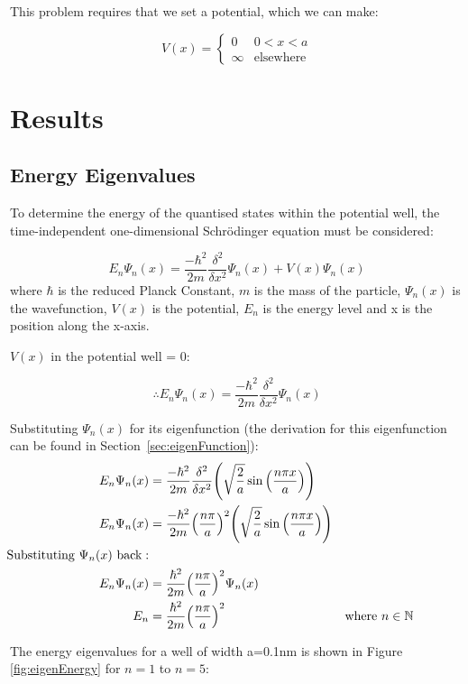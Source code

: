 This problem requires that we set a potential, which we can make:

\[
  V(x) = \begin{cases}
  0 & 0 < x < a\\
  \infty & \text{elsewhere}
\end{cases}
\]
   
\section{Results}
\subsection{Energy Eigenvalues}
To determine the energy of the quantised states within the potential well, the time-independent one-dimensional Schrödinger equation must be considered:

$$E_n \Psi_n (x) = \frac{-\hbar ^{2}}{2m}\frac{\delta^{2}}{\delta x^{2}}\Psi_n (x) + V(x)\Psi_n (x)$$
where $\hbar$ is the reduced Planck Constant, $m$ is the mass of the particle, $\Psi_n (x)$ is the wavefunction, $V(x)$ is the potential, $E_n$ is the energy level and x is the position along the x-axis. 

$V(x)$ in the potential well = 0: 

\begin{equation} \label{eq:1}
\therefore E_n \Psi_n (x) = \frac{-\hbar ^{2}}{2m}\frac{\delta^{2}}{\delta x^{2}}\Psi_n (x)
\end{equation}

Substituting $\Psi_n (x)$ for its eigenfunction (the derivation for this eigenfunction can be found in Section~\ref{sec:eigenFunction}):
\begin{align*}
E_n \Psi_n (x) &= \frac{-\hbar ^{2}}{2m}\frac{\delta^{2}}{\delta x^{2}}\Bigg(\sqrt{\frac{2}{a}}\sin\Big(\frac{n\pi x}{a}\Big)\Bigg)\\
E_n \Psi_n (x) &= \frac{-\hbar ^{2}}{2m}\Big(\frac{n\pi}{a}\Big)^{2}\Bigg(\sqrt{\frac{2}{a}}\sin\Big(\frac{n\pi x}{a}\Big)\Bigg)\\
\hspace{-1.5cm}\text{Substituting }\Psi_n (x) \text{ back}:\\
E_n \Psi_n (x) &= \frac{\hbar ^{2}}{2m}\Big(\frac{n\pi}{a}\Big)^{2}\Psi_n (x)\\
E_n &= \frac{\hbar ^{2}}{2m}\Big(\frac{n\pi}{a}\Big)^{2} & \text{where } n \in \mathbb{N}
\end{align*}

The energy eigenvalues for a well of width a=0.1nm is shown in Figure \ref{fig:eigenEnergy} for $n=1$ to $n=5$:

